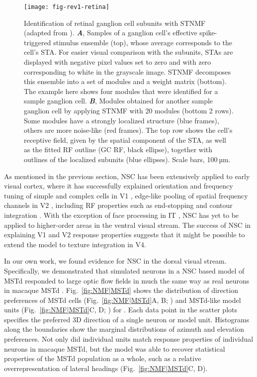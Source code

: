 \begin{figure}[ht]
	\centering
	\texttt{[image: fig-rev1-retina]}
    \caption{
    Identification of retinal ganglion cell subunits 
    with \ac{STNMF} (adapted from \cite{Liu2017}).
    \textbf{\emph{A}},
	     Samples of a ganglion cell’s effective spike-triggered stimulus ensemble (top),
         whose average corresponds to the cell’s \ac{STA}.
         For easier visual comparison with the subunits,
         \acp{STA} are displayed with negative pixel values set to zero and
         with zero corresponding to white in the grayscale image.
         \ac{STNMF} decomposes this ensemble into a set of modules and 
         a weight matrix (bottom).
         The example here shows four modules that were identified for
         a sample ganglion cell.
    \textbf{\emph{B}},
         Modules obtained for another sample ganglion cell by applying \ac{STNMF}
         with 20 modules (bottom 2 rows). Some modules have a strongly localized structure 
         (blue frames), others are more noise-like (red frames).
         The top row shows the cell’s receptive field,
         given by the spatial component of the STA, as well as the fitted \ac{RF} outline
         (GC RF, black ellipse), together with outlines of the localized subunits 
         (blue ellipses). Scale bars, 100 µm.
    }
	\label{fig:NMF|retina}
\end{figure}

As mentioned in the previous section,
\ac{NSC} has been extensively applied to early visual cortex,
where it has successfully explained 
orientation and frequency tuning of simple and complex cells in \ac{V1} \cite{Hoyer2003},
edge-like pooling of spatial frequency channels in V2 \cite{Hyvarinen2005},
including \ac{RF} properties such as end-stopping and contour integration 
\cite{HoyerHyvarinen2002}.
With the exception of face processing in \ac{IT}
\cite{LeeSeung1999,ChangTsao2017},
\ac{NSC} has yet to be applied to higher-order areas in the ventral visual stream.
The success of \ac{NSC} in explaining V1 and V2 response properties
suggests that it might be possible to extend the model to texture integration in
V4.

In our own work, we found evidence for \ac{NSC} in the dorsal visual stream.
Specifically, we demonstrated that simulated neurons 
in a \ac{NSC} based model of \ac{MSTd} 
responded to  large optic flow fields in much the same way as real neurons in macaque \ac{MSTd} \cite{Beyeler2016}.
Fig.~\ref{fig:NMF|MSTd} shows the distribution of direction preferences
of \ac{MSTd} cells (Fig.~\ref{fig:NMF|MSTd}A, B; \cite{Takahashi2007})
and \ac{MSTd}-like model units (Fig.~\ref{fig:NMF|MSTd}C, D; \cite{Beyeler2016})
for .
Each data point in the scatter plots specifies the preferred 3D direction
of a single neuron or model unit.
Histograms along the boundaries show the marginal distributions of azimuth
and elevation preferences.
Not only did individual units match response properties of individual neurons
in macaque \ac{MSTd},
but the model was able to recover statistical properties of the \ac{MSTd}
population as a whole, such as a relative overrepresentation of lateral
headings (Fig.~\ref{fig:NMF|MSTd}C, D).

